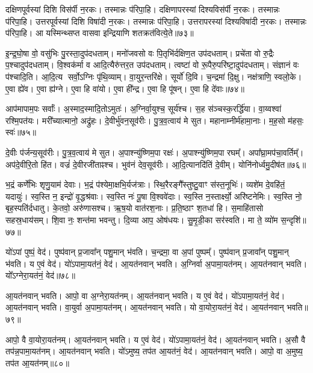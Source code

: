 दक्षिणपूर्वस्यां दिशि विस॑र्पी न॒रकः। तस्मान्नः प॑रिपा॒हि। 
दक्षिणापरस्यां दिश्यविस॑र्पी न॒रकः। तस्मान्नः प॑रिपा॒हि। 
उत्तरपूर्वस्यां दिशि विषा॑दी न॒रकः। तस्मान्नः प॑रिपा॒हि। 
उत्तरापरस्यां दिश्यविषा॑दी न॒रकः। तस्मान्नः प॑रिपा॒हि। 
आ यस्मिन्थ्सप्त वासवा इन्द्रियाणि शतक्रत॑वित्ये॒ते॥७३॥\anuvakamend


इ॒न्द्र॒घो॒षा वो॒ वसु॑भिः पु॒रस्ता॒दुप॑दधताम्। 
मनो॑जवसो वः पि॒तृभि॑र्दक्षिण॒त उप॑दधताम्। 
प्रचे॑ता वो रु॒द्रैः प॒श्चादुप॑दधताम्। 
वि॒श्वक॑र्मा व आदि॒त्यैरु॑त्तर॒त उप॑दधताम्। 
त्वष्टा॑ वो रू॒पैरु॒परि॑ष्टा॒दुप॑\-दधताम्। 
संज्ञानं वः प॑श्चादि॒ति। आ॒दि॒त्य सर्वो॒ऽग्निः पृ॑थि॒व्याम्। 
वा॒युर॒न्तरि॑क्षे। सूर्यो॑ दि॒वि। च॒न्द्रमा॑ दि॒क्षु। 
नक्ष॑त्राणि॒ स्वलो॒के। ए॒वा ह्ये॑व। ए॒वा ह्य॑ग्ने। 
ए॒वा हि वा॑यो। ए॒वा ही᳚न्द्र। ए॒वा हि पू॑षन्। ए॒वा हि दे॑वाः॥७४॥\anuvakamend


आप॑मापाम॒पः सर्वाः᳚। अ॒स्माद॒स्मादि॒तोऽमुतः॑।
अ॒ग्निर्वा॒युश्च॒ सूर्य॑श्च। स॒ह स॑ञ्चस्क॒रर्द्धि॑या। 
वा॒य्वश्वा॑ रश्मि॒पत॑यः। मरी᳚च्यात्मानो॒ अद्रु॑हः। 
दे॒वीर्भु॑वन॒सूव॑रीः। पु॒त्र॒व॒त्वाय॑ मे सुत। 
महानाम्नीर्म॑हामा॒नाः। म॒ह॒सो म॑हसः॒ स्वः॑॥७५॥


दे॒वीः प॑र्जन्य॒सूव॑रीः। पु॒त्र॒व॒त्वाय॑ मे सुत। 
अ॒पाश्न्यु॑ष्णिम॒पा रक्षः॑। अ॒पाश्न्यु॑ष्णि\-म॒पा रघम्᳚। 
अपा᳚घ्रा॒मप॑चा॒वर्तिम्᳚। अप॑दे॒वीरि॒तो हि॑त। 
वज्रं॑ दे॒वीरजी॑ताꣴश्च। भुव॑नं देव॒सूव॑रीः। 
आ॒दि॒त्यानदि॑तिं दे॒वीम्। योनि॑नोर्ध्वमु॒दीष॑त॥७६॥


भ॒द्रं कर्णे॑भिः शृणु॒याम॑ देवाः। भ॒द्रं प॑श्येमा॒क्षभि॒र्यज॑त्राः। 
स्थि॒रैरङ्गै᳚स्तुष्टु॒वाꣳ स॑स्त॒नूभिः॑। व्यशे॑म दे॒वहि॑तं॒ यदायुः॑। 
स्व॒स्ति न॒ इन्द्रो॑ वृ॒द्धश्र॑वाः। स्व॒स्ति नः॑ पू॒षा वि॒श्ववे॑दाः। 
स्व॒स्ति न॒स्तार्क्ष्यो॒ अरि॑ष्टनेमिः। स्व॒स्ति नो॒ बृह॒स्पति॑र्दधातु। 
के॒तवो॒ अरु॑णासश्च। ऋ॒ष॒यो वात॑रश॒नाः। 
प्र॒ति॒ष्ठाꣳ श॒तधा॑ हि। स॒माहि॑तासो सहस्र॒धाय॑सम्। 
शि॒वा नः॒ शन्त॑मा भवन्तु। दि॒व्या आप॒ ओष॑धयः। 
सु॒मृ॒डी॒का सर॑स्वति। मा ते॒ व्यो॑म स॒न्दृशि॑॥७७॥\anuvakamend


यो॑ऽपां पुष्पं॒ वेद॑। पुष्प॑वान्‌ प्र॒जावा᳚न् पशु॒मान् भ॑वति। 
च॒न्द्रमा॒ वा अ॒पां पुष्पम्᳚। पुष्प॑वान् प्र॒जावा᳚न् पशु॒मान्‌ भ॑वति। 
य ए॒वं वेद॑। यो॑ऽपामा॒यत॑नं॒ वेद॑। 
आ॒यत॑नवान्‌ भवति। अ॒ग्निर्वा अ॒पामा॒यत॑नम्। 
आ॒यत॑नवान्‌ भवति। यो᳚ऽग्नेरा॒यत॑नं॒ वेद॑॥७८॥


आ॒यत॑नवान्‌ भवति। आपो॒ वा अ॒ग्नेरा॒यत॑नम्। 
आ॒यत॑नवान्‌ भवति। य ए॒वं वेद॑। 
यो॑ऽपामा॒यत॑नं॒ वेद॑। आ॒यत॑नवान्‌ भवति। 
वा॒युर्वा अ॒पामा॒यत॑नम्। आ॒यत॑नवान्‌ भवति। 
यो वा॒योरा॒यत॑नं॒ वेद॑। आ॒यत॑नवान्‌ भवति॥७९॥


आपो॒ वै वा॒योरा॒यत॑नम्। आ॒यत॑नवान्‌ भवति। 
य ए॒वं वेद॑। यो॑ऽपामा॒यत॑नं॒ वेद॑। 
आ॒यत॑नवान्‌ भवति। अ॒सौ वै तप॑न्न॒पामा॒यत॑नम्। 
आ॒यत॑नवान्‌ भवति। यो॑ऽमुष्य॒ तप॑त आ॒यत॑नं॒ वेद॑। 
आ॒यत॑नवान्‌ भवति। आपो॒ वा अ॒मुष्य॒ तप॑त आ॒यत॑नम्॥८०॥


